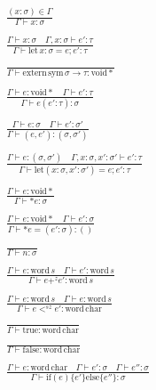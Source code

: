 \documentclass {article}
\begin{document}
\begin{gather*}
\frac
{(x : \sigma) \in \Gamma}
{\Gamma \vdash x : \sigma} \\
\\
\frac
{\Gamma \vdash x : \sigma \quad \Gamma, x : \sigma \vdash e' : \tau }
{\Gamma \vdash \text{let} \, x : \sigma = e; e' : \tau} \\
\\
\frac
{}
{\Gamma \vdash \text{extern} \, \text{sym} \, \sigma \to \tau : \text{void} *} \\
\\
\frac
{\Gamma \vdash e : \text{void} * \quad \Gamma \vdash e' : \tau}
{\Gamma \vdash e(e' : \tau) : \sigma} \\
\\
\frac
{\Gamma \vdash e : \sigma \quad \Gamma \vdash e' : \sigma'}
{\Gamma \vdash (e, e') : (\sigma, \sigma') } \\
\\
\frac
{\Gamma \vdash e : (\sigma, \sigma') \quad \Gamma, x : \sigma, x' : \sigma' \vdash e' : \tau}
{\Gamma \vdash \text{let} (x: \sigma, x' : \sigma') = e; e' : \tau} \\
\\
\frac
{\Gamma \vdash e : \text{void} *}
{\Gamma \vdash * e : \sigma} \\
\\
\frac {\Gamma \vdash e : \text{void} * \quad \Gamma \vdash e' : \sigma}
{\Gamma \vdash *e = (e' : \sigma) : ()} \\
\\
\frac
{}
{\Gamma \vdash n : \sigma} \\
\\
\frac
{\Gamma \vdash e : \text{word} \, s \quad \Gamma \vdash e' : \text{word} \, s }
{\Gamma \vdash e +^z e' : \text{word} \, s} \\
\\
\frac
{\Gamma \vdash e : \text{word} \, s \quad \Gamma \vdash e : \text{word} \, s}
{\Gamma \vdash e <^{sz} e' : \text{word} \, \text{char}} \\
\\
\frac
{}
{\Gamma \vdash \text{true} : \text{word} \, \text{char}} \\
\\
\frac
{}
{\Gamma \vdash \text{false} : \text{word} \, \text{char}} \\
\\
\frac
{\Gamma \vdash  e : \text{word} \, \text{char} \quad \Gamma \vdash e' : \sigma \quad \Gamma \vdash e'' : \sigma }
{\Gamma \vdash \text{if} (e) \{ e'\} \text{else} \{e''\} : \sigma}
\end{gather*}
\end{document}
